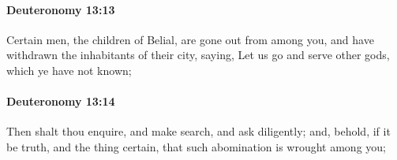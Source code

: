 		\paragraph{Deuteronomy 13:13} %
			\label{DEUTERONOMY-13-13}

			Certain men, the children of Belial, are gone out from among you, and have withdrawn the inhabitants of their city, saying, Let us go and serve other gods, which ye have not known;


		\paragraph{Deuteronomy 13:14} %
			\label{DEUTERONOMY-13-14}

			Then shalt thou enquire, and make search, and ask diligently; and, behold, if it be truth, and the thing certain, that such abomination is wrought among you;


